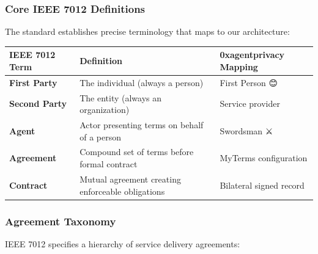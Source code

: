 \documentclass[
  11pt,
]{article}
\newcounter{none} %
\begin{document}
\subsubsection{Core IEEE 7012
Definitions}\label{core-ieee-7012-definitions}

The standard establishes precise terminology that maps to our
architecture:

{\def\LTcaptype{none} %
\begin{longtable}[]{@{}
  >{\raggedright\arraybackslash}p{}
  >{\raggedright\arraybackslash}p{}
  >{\raggedright\arraybackslash}p{}@{}}
\toprule\noalign{}
\begin{minipage}[b]{\linewidth}\raggedright
IEEE 7012 Term
\end{minipage} & \begin{minipage}[b]{\linewidth}\raggedright
Definition
\end{minipage} & \begin{minipage}[b]{\linewidth}\raggedright
0xagentprivacy Mapping
\end{minipage} \\
\midrule\noalign{}
\endhead
\bottomrule\noalign{}
\endlastfoot
\textbf{First Party} & The individual (always a person) & First Person
😊 \\
\textbf{Second Party} & The entity (always an organization) & Service
provider \\
\textbf{Agent} & Actor presenting terms on behalf of a person &
Swordsman ⚔️ \\
\textbf{Agreement} & Compound set of terms before formal contract &
MyTerms configuration \\
\textbf{Contract} & Mutual agreement creating enforceable obligations &
Bilateral signed record \\
\end{longtable}
}

\subsubsection{Agreement Taxonomy}\label{agreement-taxonomy}

IEEE 7012 specifies a hierarchy of service delivery agreements:
\end{document}
